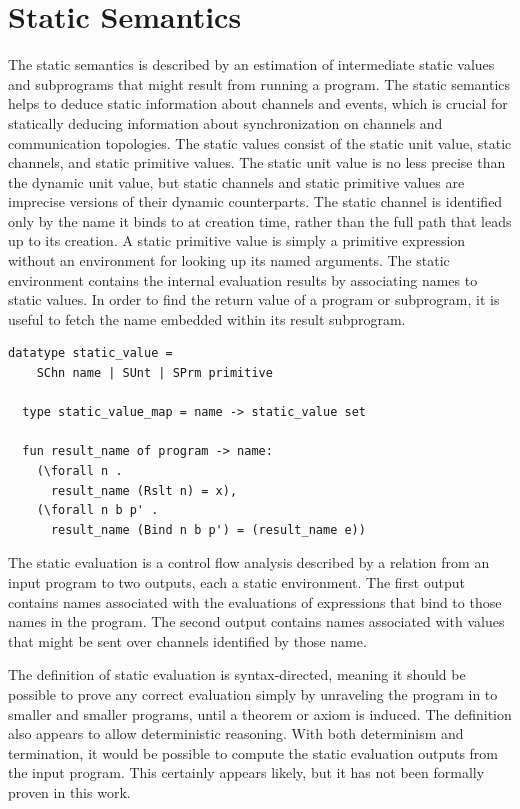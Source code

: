 \documentclass[10pt]{article}
\begin{document}
\section{Static Semantics}
The static semantics is described by an estimation of
intermediate static values and subprograms
that might result from running a program.    
The static semantics helps to deduce static information about channels and events, which is
crucial for statically deducing information about synchronization on channels and
communication topologies.
The static values consist of the static unit value, static channels, and static primitive
values. The static unit value is no less precise than the dynamic unit value, but
static channels and static primitive values are imprecise versions of their dynamic
counterparts. The static channel is identified only by the name it binds to at creation time,
rather than the full path that leads up to its creation.  A static primitive value is simply a
primitive expression without an environment for looking up its named arguments. The static
environment contains the internal evaluation results by associating names to static values.
In order to find the return value of a program or subprogram, it is useful to fetch the name
embedded within its result subprogram.

\begin{lstlisting}[language=logic, mathescape]
  datatype static_value =
    SChn name | SUnt | SPrm primitive 

  type static_value_map = name -> static_value set

  fun result_name of program -> name:
    (\forall n .
      result_name (Rslt n) = x),
    (\forall n b p' . 
      result_name (Bind n b p') = (result_name e))
  \end{lstlisting}


The static evaluation is a control flow analysis described by a relation from an input program
to two outputs, each a static environment. The first output contains names associated with the
evaluations of expressions that bind to those names in the program. The second output contains
names associated with values that might be sent over channels identified by those name.

The definition of static evaluation is syntax-directed, meaning it should be possible to
prove any correct evaluation simply by unraveling the program in to smaller and smaller
programs, until a theorem or axiom is induced. The definition also appears to allow
deterministic reasoning. With both determinism and termination, it would be possible to compute
the static evaluation outputs from the input program. This certainly appears likely, but it has
not been formally proven in this work.
\end{document}

